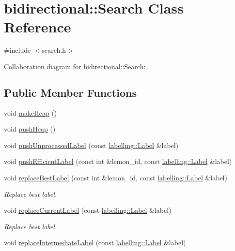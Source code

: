 \hypertarget{classbidirectional_1_1Search}{}\section{bidirectional\+:\+:Search Class Reference}
\label{classbidirectional_1_1Search}


{\ttfamily \#include $<$search.\+h$>$}



Collaboration diagram for bidirectional\+:\+:Search\+:
\subsection*{Public Member Functions}
\begin{DoxyCompactItemize}
\item 
void \hyperlink{classbidirectional_1_1Search_af38a13e27dcd3b69e78dc7943ee90f46}{make\+Heap} ()
\item 
void \hyperlink{classbidirectional_1_1Search_a2c1a7067a4ce02805e8ab5f9beac8c7c}{push\+Heap} ()
\item 
void \hyperlink{classbidirectional_1_1Search_ab2c67d7e3c1040f4d2586f3e5a82e1bf}{push\+Unprocessed\+Label} (const \hyperlink{classlabelling_1_1Label}{labelling\+::\+Label} \&label)
\item 
void \hyperlink{classbidirectional_1_1Search_a729c7a379b04d777ac0bc844e5b488b7}{push\+Efficient\+Label} (const int \&lemon\+\_\+id, const \hyperlink{classlabelling_1_1Label}{labelling\+::\+Label} \&label)
\item 
void \hyperlink{classbidirectional_1_1Search_a25ab49cfbc9f074630e059429fc7f0cc}{replace\+Best\+Label} (const int \&lemon\+\_\+id, const \hyperlink{classlabelling_1_1Label}{labelling\+::\+Label} \&label)
\begin{DoxyCompactList}\small\item\em Replace best label. \end{DoxyCompactList}\item 
void \hyperlink{classbidirectional_1_1Search_a2b2e85f750fd35df23f470ce2222dcfb}{replace\+Current\+Label} (const \hyperlink{classlabelling_1_1Label}{labelling\+::\+Label} \&label)
\begin{DoxyCompactList}\small\item\em Replace best label. \end{DoxyCompactList}\item 
void \hyperlink{classbidirectional_1_1Search_a66b5168d25b5fe7f673f6d335ae716d1}{replace\+Intermediate\+Label} (const \hyperlink{classlabelling_1_1Label}{labelling\+::\+Label} \&label)

\end{DoxyCompactItemize}
